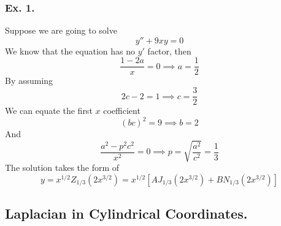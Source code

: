 \documentclass[../../main.tex]{subfiles}
\begin{document}
\subsubsection{Ex. 1.} Suppose we are going to solve 
\begin{equation*}
  y'' +9xy=0
\end{equation*}
We know that the equation has no $y'$ factor, then 
\begin{equation*}
  \frac{1-2a}{x}=0\implies a=\frac{1}{2}
\end{equation*}
By assuming
\begin{equation*}
  2c-2=1\implies c=\frac{3}{2}
\end{equation*}
We can equate the first $x$ coefficient
\begin{equation*}
  (bc)^2=9\implies b=2
\end{equation*}
And
\begin{equation*}
  \frac{a^2-p^2c^2}{x^2}=0\implies p=\sqrt{\frac{a^2}{c^2}}=\frac{1}{3}
\end{equation*}
The solution takes the form of 
\begin{equation*}
  y=x^{1/2}Z_{1/3}(2x^{3/2})=x^{1/2}\left[AJ_{1/3}(2x^{3/2})+BN_{1/3}(2x^{3/2})\right]
\end{equation*}

\subsection{Laplacian in Cylindrical Coordinates.}
\end{document}
